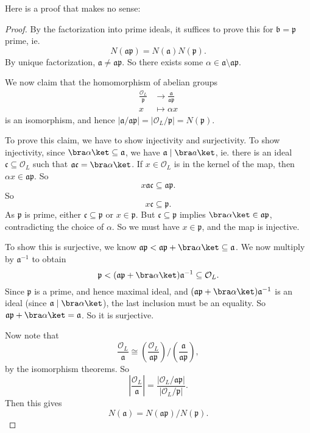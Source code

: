 \documentclass[a4paper]{article}
\begin{document}
Here is a proof that makes no sense:
\begin{proof}
  By the factorization into prime ideals, it suffices to prove this for $\mathfrak{b} = \mathfrak{p}$ prime, ie.
  \[
    N(\mathfrak{a}\mathfrak{p}) = N(\mathfrak{a}) N(\mathfrak{p}).
  \]
  By unique factorization, $\mathfrak{a} \not= \mathfrak{a} \mathfrak{p}$. So there exists some $\alpha \in \mathfrak{a} \setminus \mathfrak{a} \mathfrak{p}$.

  We now claim that the homomorphism of abelian groups
  \begin{align*}
    \frac{\mathcal{O}_L}{\mathfrak{p}} &\to \frac{\mathfrak{a}}{\mathfrak{a}\mathfrak{p}}\\
    x &\mapsto \alpha x
  \end{align*}
  is an isomorphism, and hence $|\mathfrak{a}/\mathfrak{a}\mathfrak{p}| = |\mathcal{O}_L/\mathfrak{p}| = N(\mathfrak{p})$.

  To prove this claim, we have to show injectivity and surjectivity. To show injectivity, since $\bra \alpha\ket \subseteq \mathfrak{a}$, we have $\mathfrak{a} \mid \bra a\ket$, ie. there is an ideal $\mathfrak{c} \subseteq \mathcal{O}_L$ such that $\mathfrak{a}\mathfrak{c} = \bra \alpha\ket$. If $x \in \mathcal{O}_L$ is in the kernel of the map, then $\alpha x \in \mathfrak{a}\mathfrak{p}$. So
  \[
    x \mathfrak{a}\mathfrak{c} \subseteq \mathfrak{a}\mathfrak{p}.
  \]
  So
  \[
    x\mathfrak{c} \subseteq \mathfrak{p}.
  \]
  As $\mathfrak{p}$ is prime, either $\mathfrak{c} \subseteq \mathfrak{p}$ or $x \in \mathfrak{p}$. But $\mathfrak{c} \subseteq \mathfrak{p}$ implies $\bra \alpha\ket \in \mathfrak{a}\mathfrak{p}$, contradicting the choice of $\alpha$. So we must have $x \in \mathfrak{p}$, and the map is injective.

  To show this is surjective, we know $\mathfrak{a}\mathfrak{p} < \mathfrak{a}\mathfrak{p} + \bra \alpha\ket \subseteq \mathfrak{a}$. We now multiply by $\mathfrak{a}^{-1}$ to obtain
  \[
    \mathfrak{p} < (\mathfrak{a} \mathfrak{p} + \bra \alpha\ket) \mathfrak{a}^{-1} \subseteq \mathcal{O}_L.
  \]
  Since $\mathfrak{p}$ is a prime, and hence maximal ideal, and $(\mathfrak{a} \mathfrak{p} + \bra \alpha\ket) \mathfrak{a}^{-1}$ is an ideal (since $\mathfrak{a} \mid \bra \alpha\ket$), the last inclusion must be an equality. So $\mathfrak{a}\mathfrak{p} + \bra\alpha\ket = \mathfrak{a}$. So it is surjective.

  Now note that
  \[
    \frac{\mathcal{O}_L}{\mathfrak{a}} \cong \left(\frac{\mathcal{O}_L}{\mathfrak{a}\mathfrak{p}}\right) \big/ \left(\frac{\mathfrak{a}}{\mathfrak{a}\mathfrak{p}}\right),
  \]
  by the isomorphism theorems. So
  \[
    \left|\frac{\mathcal{O}_L}{\mathfrak{a}}\right| = \frac{|\mathcal{O}_L/\mathfrak{a}\mathfrak{p}|}{|\mathcal{O}_L/\mathfrak{p}|}.
  \]
  Then this gives
  \[
    N(\mathfrak{a}) = N(\mathfrak{a}\mathfrak{p}) / N(\mathfrak{p}).
  \]
\end{proof}
\end{document}
